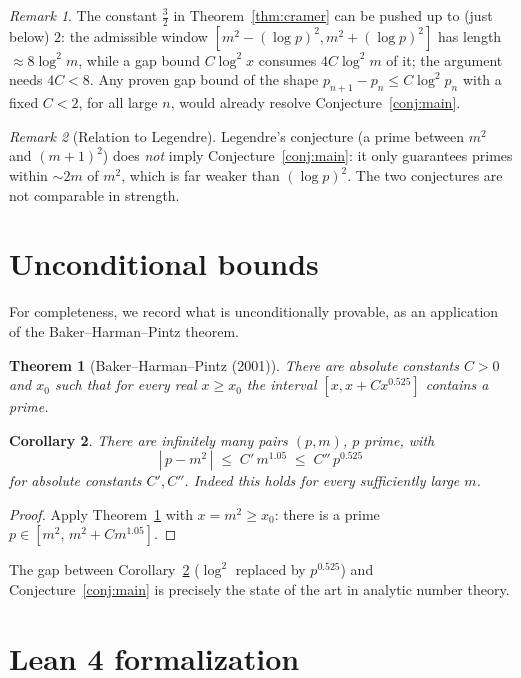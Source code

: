\documentclass[11pt]{article}
\newtheorem{theorem}{Theorem}[section]
\newtheorem{corollary}[theorem]{Corollary}
\theoremstyle{definition}
\theoremstyle{remark}
\newtheorem*{remark}{Remark}
\begin{document}
\begin{remark}
The constant $\tfrac32$ in Theorem~\ref{thm:cramer} can be pushed up to (just below) $2$: the admissible window $[m^2 - (\log p)^2, m^2 + (\log p)^2]$ has length $\approx 8\log^2 m$, while a gap bound $C\log^2 x$ consumes $4C \log^2 m$ of it; the argument needs $4C < 8$. Any proven gap bound of the shape $p_{n+1}-p_n \le C\log^2 p_n$ with a fixed $C < 2$, for all large $n$, would already resolve Conjecture~\ref{conj:main}.
\end{remark}

\begin{remark}[Relation to Legendre]
Legendre's conjecture (a prime between $m^2$ and $(m+1)^2$) does \emph{not} imply Conjecture~\ref{conj:main}: it only guarantees primes within $\sim 2m$ of $m^2$, which is far weaker than $(\log p)^2$. The two conjectures are not comparable in strength.
\end{remark}

\section{Unconditional bounds}

For completeness, we record what is unconditionally provable, as an application of the Baker--Harman--Pintz theorem.

\begin{theorem}[{Baker--Harman--Pintz (2001)}]\label{thm:bhp}
There are absolute constants $C > 0$ and $x_0$ such that for every real $x \ge x_0$ the interval $[x, x + C x^{0.525}]$ contains a prime.
\end{theorem}

\begin{corollary}\label{cor:uncond}
There are infinitely many pairs $(p, m)$, $p$ prime, with
\[
|\,p - m^2\,| \;\le\; C'\, m^{1.05} \;\le\; C''\, p^{0.525}
\]
for absolute constants $C', C''$. Indeed this holds for \emph{every} sufficiently large $m$.
\end{corollary}

\begin{proof}
Apply Theorem~\ref{thm:bhp} with $x = m^2 \ge x_0$: there is a prime $p \in [m^2,\, m^2 + C m^{1.05}]$.
\end{proof}

The gap between Corollary~\ref{cor:uncond} ($\log^2$ replaced by $p^{0.525}$) and Conjecture~\ref{conj:main} is precisely the state of the art in analytic number theory.

\section{Lean 4 formalization}\label{sec:lean}
\end{document}

